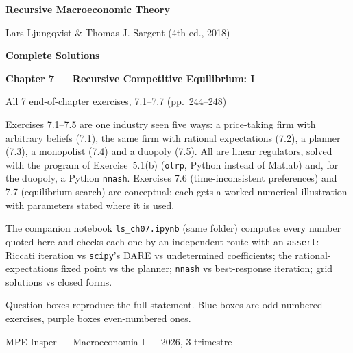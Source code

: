 \documentclass[12pt, letterpaper]{article}
\begin{document}
\begin{titlepage}
\centering
\vspace*{2.5cm}
{\Huge\bfseries\color{darkblue} Recursive Macroeconomic Theory\par}
\vspace{6pt}
{\large Lars Ljungqvist \& Thomas J. Sargent (4th ed., 2018)\par}
\vspace{1.4cm}
{\LARGE\bfseries Complete Solutions\par}
\vspace{6pt}
{\LARGE\bfseries Chapter 7 --- Recursive Competitive Equilibrium: I\par}
\vspace{1.2cm}
{\large All 7 end-of-chapter exercises, 7.1--7.7 (pp.~244--248)\par}
\vspace{2cm}

\begin{tcolorbox}[theorybox,title={What is in this file},width=0.86\textwidth]
\small
Exercises 7.1--7.5 are one industry seen five ways: a price-taking firm with arbitrary beliefs
(7.1), the same firm with rational expectations (7.2), a planner (7.3), a monopolist (7.4) and a
duopoly (7.5). All are linear regulators, solved with the program of Exercise~5.1(b)
(\texttt{olrp}, Python instead of Matlab) and, for the duopoly, a Python \texttt{nnash}. Exercises
7.6 (time-inconsistent preferences) and 7.7 (equilibrium search) are conceptual; each gets a worked
numerical illustration with parameters stated where it is used.

\smallskip
The companion notebook \texttt{ls\_ch07.ipynb} (same folder) computes every number quoted here and
checks each one by an independent route with an \texttt{assert}: Riccati iteration vs \texttt{scipy}'s
DARE vs undetermined coefficients; the rational-expectations fixed point vs the planner; \texttt{nnash}
vs best-response iteration; grid solutions vs closed forms.

\smallskip
Question boxes reproduce the full statement. Blue boxes are odd-numbered exercises, purple boxes
even-numbered ones.
\end{tcolorbox}

\vfill
{\small MPE Insper --- Macroeconomia I --- 2026, 3\textordmasculine{} trimestre\par}
\end{titlepage}
\end{document}
